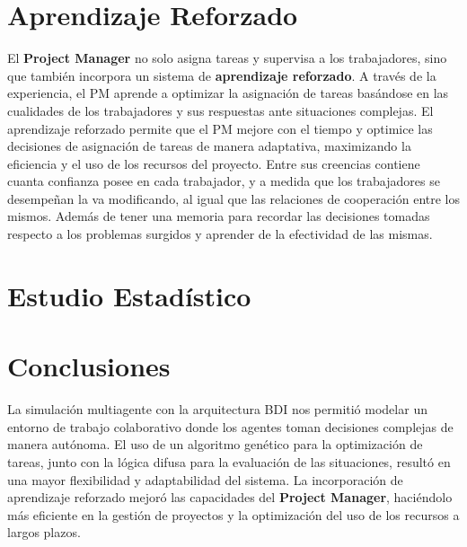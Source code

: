 \documentclass[a4paper, 12pt]{article}
\begin{document}
\section{Aprendizaje Reforzado}
El \textbf{Project Manager} no solo asigna tareas y supervisa a los trabajadores, sino que también incorpora un sistema de \textbf{aprendizaje reforzado}. A través de la experiencia, el PM aprende a optimizar la asignación de tareas basándose en las cualidades de los trabajadores y sus respuestas ante situaciones complejas. El aprendizaje reforzado permite que el PM mejore con el tiempo y optimice las decisiones de asignación de tareas de manera adaptativa, maximizando la eficiencia y el uso de los recursos del proyecto. Entre sus creencias contiene cuanta confianza posee en cada trabajador, y a medida que los trabajadores se desempeñan la va modificando, al igual que las relaciones de cooperación entre los mismos. Además de tener una memoria para recordar las decisiones tomadas respecto a los problemas surgidos y aprender de la efectividad de las mismas.

\section{Estudio Estad\'istico}

\section{Conclusiones}
La simulación multiagente con la arquitectura BDI nos permitió modelar un entorno de trabajo colaborativo donde los agentes toman decisiones complejas de manera autónoma. El uso de un algoritmo genético para la optimización de tareas, junto con la lógica difusa para la evaluación de las situaciones, resultó en una mayor flexibilidad y adaptabilidad del sistema. La incorporación de aprendizaje reforzado mejoró las capacidades del \textbf{Project Manager}, haciéndolo más eficiente en la gestión de proyectos y la optimización del uso de los recursos a largos plazos.
\end{document}
